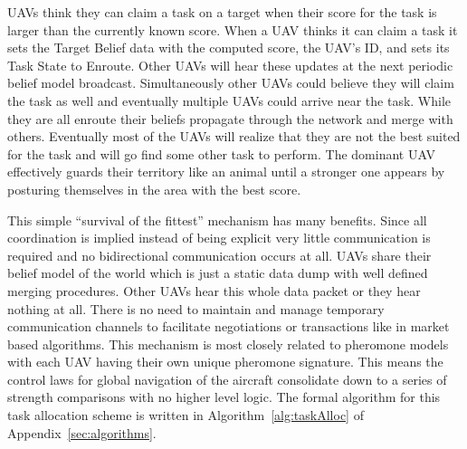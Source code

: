 UAVs think they can claim a task on a target when their score for the task is larger than the currently known score.  When a UAV thinks it can claim a task it sets the Target Belief data with the computed score, the UAV's ID, and sets its Task State to Enroute.  Other UAVs will hear these updates at the next periodic belief model broadcast.  Simultaneously other UAVs could believe they will claim the task as well and eventually multiple UAVs could arrive near the task.  While they are all enroute their beliefs propagate through the network and merge with others.  Eventually most of the UAVs will realize that they are not the best suited for the task and will go find some other task to perform.  The dominant UAV effectively guards their territory like an animal until a stronger one appears by posturing themselves in the area with the best score.

This simple ``survival of the fittest'' mechanism has many benefits.  Since all coordination is implied instead of being explicit very little communication is required and no bidirectional communication occurs at all.  UAVs share their belief model of the world which is just a static data dump with well defined merging procedures.  Other UAVs hear this whole data packet or they hear nothing at all.  There is no need to maintain and manage temporary communication channels to facilitate negotiations or transactions like in market based algorithms.  This mechanism is most closely related to pheromone models with each UAV having their own unique pheromone signature.  This means the control laws for global navigation of the aircraft consolidate down to a series of strength comparisons with no higher level logic.  The formal algorithm for this task allocation scheme is written in Algorithm~\ref{alg:taskAlloc} of Appendix~\ref{sec:algorithms}.

